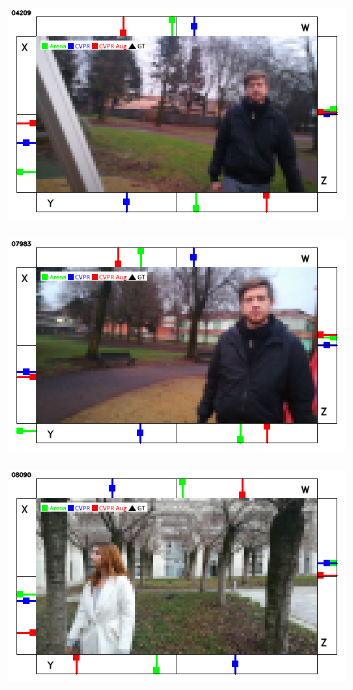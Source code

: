 \begin{figure}[H]
\begin{center}
\begin{subfigure}[h]{0.49\textwidth}
		\end{subfigure}
		\vfill
		\begin{subfigure}[h]{0.49\textwidth}
			\centering
			\includegraphics[width=0.98\textwidth]{"contents/images/qualitative-videos/W-bias-park01-4209"}
		\end{subfigure}
		\hfill
		\begin{subfigure}[h]{0.49\textwidth}
			\centering
			\includegraphics[width=0.98\textwidth]{"contents/images/qualitative-videos/W-bias-park01-7983"}
		\end{subfigure}
		\vfill
		\begin{subfigure}[h]{0.49\textwidth}
			\centering
			\includegraphics[width=0.98\textwidth]{"contents/images/qualitative-videos/W-bias-square01-8090"}

\end{subfigure}
\end{center}
\end{figure}
